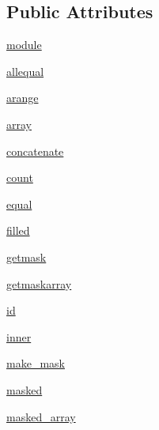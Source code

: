 \subsection*{Public Attributes}
\begin{DoxyCompactItemize}
\item 
\hyperlink{classnumpy_1_1ma_1_1timer__comparison_1_1ModuleTester_a966eb36b13d136cce768aa7bfc19abba}{module}
\item 
\hyperlink{classnumpy_1_1ma_1_1timer__comparison_1_1ModuleTester_af96ebe8e4526fa04baf8bb8c12773453}{allequal}
\item 
\hyperlink{classnumpy_1_1ma_1_1timer__comparison_1_1ModuleTester_abaae8f6c767d7c76e4ff724b23bc6549}{arange}
\item 
\hyperlink{classnumpy_1_1ma_1_1timer__comparison_1_1ModuleTester_a001570428e6871838df5b912995dac16}{array}
\item 
\hyperlink{classnumpy_1_1ma_1_1timer__comparison_1_1ModuleTester_ad31c3eac6ce159d4673e821b652334d5}{concatenate}
\item 
\hyperlink{classnumpy_1_1ma_1_1timer__comparison_1_1ModuleTester_a08c4a9ab0c522ba1eb08b267e92428a6}{count}
\item 
\hyperlink{classnumpy_1_1ma_1_1timer__comparison_1_1ModuleTester_af9c220993d750e82b8274898e047a731}{equal}
\item 
\hyperlink{classnumpy_1_1ma_1_1timer__comparison_1_1ModuleTester_ae96a28e90864850e713dcf1f5ffaf710}{filled}
\item 
\hyperlink{classnumpy_1_1ma_1_1timer__comparison_1_1ModuleTester_a5111fa688a78bd6b43aeb024433b46f3}{getmask}
\item 
\hyperlink{classnumpy_1_1ma_1_1timer__comparison_1_1ModuleTester_a00d2c3d8511d0cdff013c5010f8ffd65}{getmaskarray}
\item 
\hyperlink{classnumpy_1_1ma_1_1timer__comparison_1_1ModuleTester_acc7fbab565d38b46caa0281e6d454ce3}{id}
\item 
\hyperlink{classnumpy_1_1ma_1_1timer__comparison_1_1ModuleTester_a03233ee09dc870fe0b4cade481464341}{inner}
\item 
\hyperlink{classnumpy_1_1ma_1_1timer__comparison_1_1ModuleTester_aec18344503d9d15064a99061892b19ba}{make\+\_\+mask}
\item 
\hyperlink{classnumpy_1_1ma_1_1timer__comparison_1_1ModuleTester_aa4c07895064da12dfadef22cae44aaf7}{masked}
\item 
\hyperlink{classnumpy_1_1ma_1_1timer__comparison_1_1ModuleTester_aab79aacf9a784805af209acf732015d2}{masked\+\_\+array}

\end{DoxyCompactItemize}
